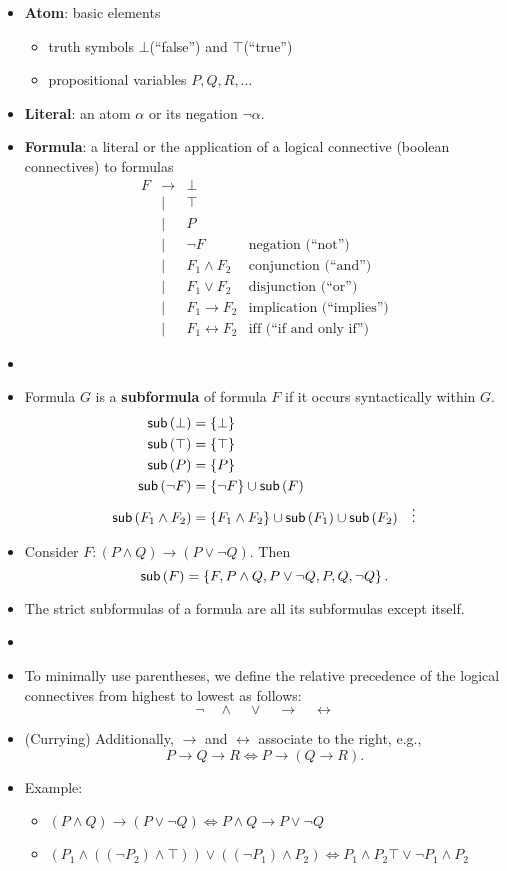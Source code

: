 \begin{itemize}
	\item \textbf{Atom}: basic elements
	\begin{itemize}
		\item truth symbols $\bot$(``false'') and $\top$(``true'')
		\item propositional variables $P,Q,R,\dots$
	\end{itemize}
	\item \textbf{Literal}: an atom $\alpha$ or its negation $\lnot\alpha$.
	\item \textbf{Formula}: a literal or the application of a logical connective (boolean connectives) to formulas
	\[
	\begin{array}{ccll}
		F & \to & \bot \\
		& | & \top \\
		& | & P \\
		& | & \lnot F & \text{negation (``not'')} \\
		& | & F_1\land F_2 & \text{conjunction (``and'')} \\
		& | & F_1\lor F_2 & \text{disjunction (``or'')} \\
		& | & F_1\to F_2 & \text{implication (``implies'')} \\
		& | & F_1\leftrightarrow F_2 & \text{iff (``if and only if'')}
	\end{array}
	\]
	\item[]
	\item Formula $G$ is a \textbf{subformula} of formula $F$ if it occurs syntactically within $G$.
	\begin{align*}
		\textsf{sub}\left(\bot\right) &= \set{\bot} \\
		\textsf{sub}\left(\top\right) &= \set{\top} \\
		\textsf{sub}\left(P\right) &= \set{P} \\
		\textsf{sub}\left(\lnot F\right) &= \set{\lnot F}\cup\textsf{sub}\left(F\right) \\
		\textsf{sub}\left(F_1\land F_2\right) &= \set{F_1\land F_2}\cup\textsf{sub}\left(F_1\right)\cup\textsf{sub}\left(F_2\right)
		&\vdots
	\end{align*}
	\item Consider $F:(P\land Q)\to (P\lor\lnot Q)$. Then \[
	\textsf{sub}\left(F\right)=\set{F,P\land Q,P\lor\lnot Q,P,Q,\lnot Q}.
	\]
	\item The strict subformulas of a formula are all its subformulas except itself.
	\item[]
	\item To minimally use parentheses, we define the relative precedence of the logical connectives from highest to lowest as follows: \[
	\lnot\quad\land\quad\lor\quad\rightarrow\quad\leftrightarrow
	\]
	\item (Currying) Additionally, $\rightarrow$ and $\leftrightarrow$ associate to the right, e.g., \[
	P\to Q\to R\iff P\to(Q\to R).
	\]
	\item Example:
	\begin{itemize}
		\item $(P\land Q)\to (P\lor\lnot Q)\iff P\land Q\to P\lor \lnot Q$
		\item $(P_1\land((\lnot P_2)\land\top))\lor((\lnot P_1)\land P_2)\iff P_1\land P_2\top\lor\lnot P_1\land P_2$
	\end{itemize}
\end{itemize}

